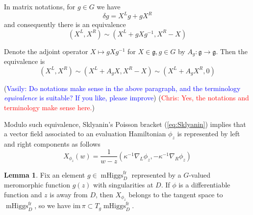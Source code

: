\documentclass[11pt, oneside, reqno]{amsart}
\theoremstyle{definition} \newtheorem{definition}{Definition}[section]
\newtheorem{lemma}[definition]{Lemma}
\theoremstyle{definition} \newtheorem{remark}[definition]{Remark}
\theoremstyle{definition} \newtheorem{remarks}[definition]{Remarks}
\theoremstyle{definition} \newtheorem{question}[definition]{Question}
\theoremstyle{definition} \newtheorem*{note}{Note}
\theoremstyle{definition} \newtheorem{example}[definition]{Example}
\theoremstyle{definition} \newtheorem{examples}[definition]{Examples}
\renewcommand{\gg}{\mathfrak{g}}
\DeclareMathOperator{\mhiggs}{mHiggs}
\newcommand{\fr}{\mathrm{fr}}
\newcommand{\chris}[1]{(\textcolor{red}{Chris: #1})}
\newcommand{\vasily}[1]{(\textcolor{blue}{Vasily: #1})}
\begin{document}
In matrix notations, for $g \in G$ we have
\begin{equation}
  \delta g = X^L g + g X^R 
\end{equation}
and consequently there is an equivalence 
\begin{equation}
\label{eq:equivalence0}
  (X^L, X^R) \sim (X^L + g X g^{-1}, X^R -  X)
\end{equation}

Denote the adjoint operator $X \mapsto g X g^{-1}$ for $X \in \gg, g \in G$ by $A_{g}: \gg \to \gg$.
Then the equivalence is
\begin{equation}
\label{eq:equivalence}
    (X^L, X^R) \sim (X^L + A_{g} X , X^{R} -  X) \sim (X^{L} +  A_{g} X^{R}, 0) 
\end{equation}

\vasily{Do notations make sense in the above paragraph, and the
  terminology \emph{equivalence} is suitable? If you like, please improve} \chris{Yes, the notations and terminology make sense here.}


Modulo such equivalence, Sklyanin's Poisson bracket (\ref{eq:Sklyanin}) implies
that a vector field associated to an evaluation Hamiltonian $\phi_z$ is represented by
left and right components as follows 
\begin{equation}
\label{eq:Xphiz}
X_{\phi_z} (w) =  \frac{1}{w - z} ( \kappa^{-1} \nabla_{L} \phi_z,  - \kappa^{-1}\nabla_{R} \phi_{z})
\end{equation}


\begin{lemma}\label{phitoX}
  Fix an element $g \in \mhiggs^{\fr}_{D}$ represented by a $G$-valued
  meromorphic function $g(z)$ with singularities at $D$.    If $\phi$ is a differentiable function and $z$ is away from $D$, then $X_{\phi_z}$
  belongs to the tangent space to $\mhiggs^{\fr}_{D}$, so we have $\mathrm{im} \, \pi \subset T_{g}\mhiggs^{\fr}_D$. 
\end{lemma}
\end{document}
